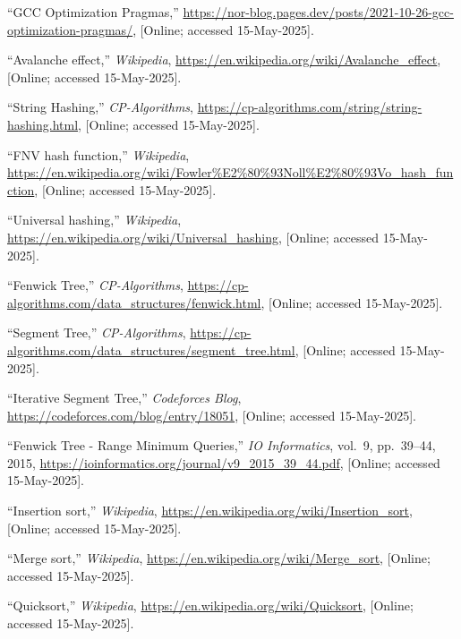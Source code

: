 \documentclass[12pt]{article}
\begin{document}
\begin{thebibliography}{50}

  ``GCC Optimization Pragmas,''
  \url{https://nor-blog.pages.dev/posts/2021-10-26-gcc-optimization-pragmas/},
  [Online; accessed 15-May-2025].
  
  ``Avalanche effect,''
  \emph{Wikipedia},
  \url{https://en.wikipedia.org/wiki/Avalanche_effect},
  [Online; accessed 15-May-2025].
  
  ``String Hashing,''
  \emph{CP-Algorithms},
  \url{https://cp-algorithms.com/string/string-hashing.html},
  [Online; accessed 15-May-2025].

  ``FNV hash function,''
  \emph{Wikipedia},
  \url{https://en.wikipedia.org/wiki/Fowler%E2%80%93Noll%E2%80%93Vo_hash_function},
  [Online; accessed 15-May-2025].
  
  ``Universal hashing,''
  \emph{Wikipedia},
  \url{https://en.wikipedia.org/wiki/Universal_hashing},
  [Online; accessed 15-May-2025].
  
  ``Fenwick Tree,''
  \emph{CP-Algorithms},
  \url{https://cp-algorithms.com/data_structures/fenwick.html},
  [Online; accessed 15-May-2025].
  
  ``Segment Tree,''
  \emph{CP-Algorithms},
  \url{https://cp-algorithms.com/data_structures/segment_tree.html},
  [Online; accessed 15-May-2025].
  
  ``Iterative Segment Tree,''
  \emph{Codeforces Blog},
  \url{https://codeforces.com/blog/entry/18051},
  [Online; accessed 15-May-2025].
  
  ``Fenwick Tree - Range Minimum Queries,''
  \emph{IO Informatics}, vol.~9, pp.~39--44, 2015,
  \url{https://ioinformatics.org/journal/v9_2015_39_44.pdf},
  [Online; accessed 15-May-2025].
  
  ``Insertion sort,''
  \emph{Wikipedia},
  \url{https://en.wikipedia.org/wiki/Insertion_sort},
  [Online; accessed 15-May-2025].
  
  ``Merge sort,''
  \emph{Wikipedia},
  \url{https://en.wikipedia.org/wiki/Merge_sort},
  [Online; accessed 15-May-2025].
  
  ``Quicksort,''
  \emph{Wikipedia},
  \url{https://en.wikipedia.org/wiki/Quicksort},
  [Online; accessed 15-May-2025].
  

\end{thebibliography}
\end{document}
